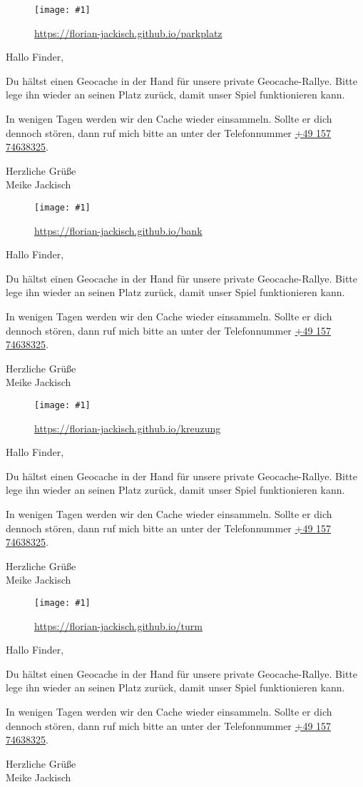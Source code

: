 \documentclass[a4paper,oneside]{article}
\newcommand{\myQRCodes}[2]{
        \begin{minipage}[t][7cm][b]{7cm}
        \begin{figure}[H]
            \centering
            \texttt{[image: \#1]}
            \caption*{\url{#2}}
        \end{figure}
        \end{minipage}
}
\newcommand{\explanation}{
        \setlength{\skip0}{\parskip}
        \begin{minipage}[t][7cm][c]{7cm}
        \setlength\parskip{\skip0}
Hallo Finder,

Du hältst einen Geocache in der Hand für unsere private Geocache-Rallye.
Bitte lege ihn wieder an seinen Platz zurück, damit unser Spiel funktionieren kann.

In wenigen Tagen werden wir den Cache wieder einsammeln.
Sollte er dich dennoch stören, dann ruf mich bitte an unter der Telefonnummer \href{tel:+49 157 74638325}{+49 157 74638325}.

Herzliche Grüße\\
Meike Jackisch
        \end{minipage}
}
\begin{document}

\myQRCodes{parkplatz.png}{https://florian-jackisch.github.io/parkplatz}
\explanation

\myQRCodes{bank.png}{https://florian-jackisch.github.io/bank}
\explanation

\myQRCodes{kreuzung.png}{https://florian-jackisch.github.io/kreuzung}
\explanation

\myQRCodes{turm.png}{https://florian-jackisch.github.io/turm}
\explanation
\end{document}
